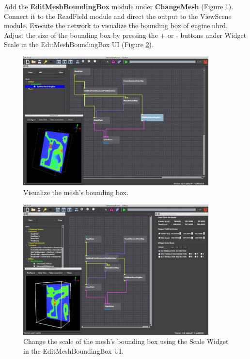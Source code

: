 \documentclass[fleqn,11pt,openany]{book}
\begin{document}
Add the \textbf{EditMeshBoundingBox} module under \textbf{ChangeMesh} (Figure \ref{fig:addbbox}). Connect it to the ReadField module and direct the output to the ViewScene module. Execute the network to visualize the bounding box of engine.nhrd. Adjust the size of the bounding box by pressing the + or - buttons under Widget Scale in the EditMeshBoundingBox UI (Figure \ref{fig:addbbox2}).

\begin{figure}[H]
\center
\includegraphics[width=0.9\textwidth]{BasicTutorial_figures/editmeshboundingbox.png}
\caption{Visualize the mesh's bounding box.}
\label{fig:addbbox}
\end{figure}

\begin{figure}[H]
\center
\includegraphics[width=0.9\textwidth]{BasicTutorial_figures/editmeshbbox.png}
\caption{Change the scale of the mesh's bounding box using the Scale Widget in the EditMeshBoundingBox UI.}
\label{fig:addbbox2}
\end{figure}
\end{document}
